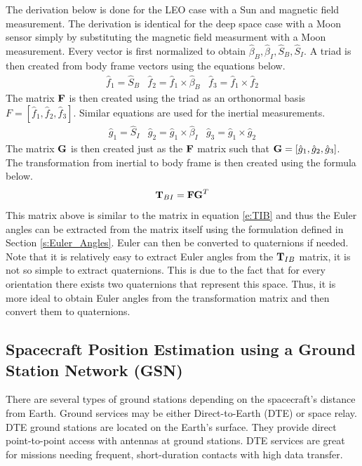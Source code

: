 \documentclass{article}
\begin{document}
The derivation below is done for the LEO case with a Sun and magnetic
field measurement. The derivation is identical for the deep space case
with a Moon sensor simply by substituting the magnetic field
measurment with a Moon measurement. Every vector is first normalized to obtain
$\hat{\beta}_B,\hat{\beta}_I,\hat{S}_B,\hat{S}_I$. A triad is then created
from body frame vectors using the equations below.
\begin{equation}
  \begin{matrix} \hat{f}_1 = \hat{S}_B & \hat{f}_2 = \hat{f}_1 \times
    \hat{\beta}_B & \hat{f}_3 = \hat{f}_1 \times \hat{f}_2 \end{matrix}
\end{equation}
The matrix ${\bf F}$ is then created using the triad as an orthonormal basis
$F = [\hat{f}_1,\hat{f}_2,\hat{f}_3]$. Similar equations are used for
the inertial measurements. 
\begin{equation}
  \begin{matrix} \hat{g}_1 = \hat{S}_I & \hat{g}_2 = \hat{g}_1 \times
    \hat{\beta}_I & \hat{g}_3 = \hat{g}_1 \times \hat{g}_2 \end{matrix}
\end{equation}
The matrix ${\bf G}$ is then created just as the ${\bf F}$ matrix such
that ${\bf G} =
[\hat{g}_1,\hat{g}_2,\hat{g}_3]$. The transformation from inertial to
body frame is then created using the formula below.
\begin{equation}
  {\bf T}_{BI} = {\bf FG}^T
\end{equation}
This matrix above is similar to the matrix in equation \ref{e:TIB} and
thus the Euler angles can be extracted from the matrix itself using
the formulation defined in Section \ref{s:Euler_Angles}. Euler can
then be converted to quaternions if needed. Note that it is relatively
easy to extract Euler angles from the ${\bf T}_{IB}$ matrix, it is not so
simple to extract quaternions. This is due to the fact that for every
orientation there exists two quaternions that represent this
space. Thus, it is more ideal to obtain Euler angles from the
transformation matrix and then convert them to quaternions.

\subsection{Spacecraft Position Estimation using a Ground Station Network (GSN)}

There are several types of ground stations depending on the
spacecraft’s distance from Earth. Ground services may be either
Direct-to-Earth (DTE) or space relay. DTE ground stations are located
on the Earth’s surface. They provide direct point-to-point access with
antennas at ground stations. DTE services are great for missions
needing frequent, short-duration contacts with high data transfer. 
\end{document}
